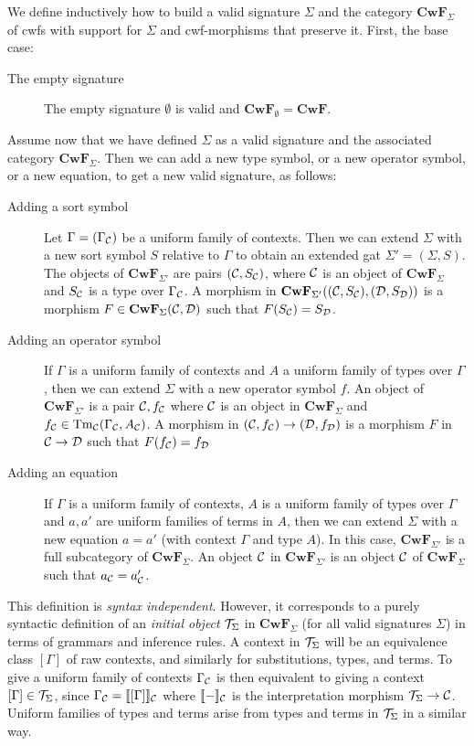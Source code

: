 \documentclass{lmcs}
\def\D{\mathcal{D}}
\def\Cwf{\mathbf{CwF}}
\begin{document}
\begin{definition}
We define inductively how to build a valid signature $\Sigma$ and the category $\Cwf_\Sigma$ of cwfs with support for $\Sigma$ and cwf-morphisms that preserve it. First, the base case:
\begin{description}
\item[The empty signature] The empty signature $\emptyset$ is valid and $\Cwf_\emptyset = \Cwf$. 
\end{description}
Assume now that we have defined $\Sigma$ as a valid signature and the associated
category $\Cwf_{\Sigma}$.
Then we can add a new type symbol, or a new operator symbol, or a new equation, to get a new valid signature,
as follows:
\begin{description}
\item[Adding a sort symbol] 
  Let $\Gamma = (\Gamma_{\mathcal C})$ be a uniform family of contexts.
  Then we can extend $\Sigma$ with a new sort symbol $S$ relative to $\Gamma$ to obtain an extended gat
  $\Sigma' = (\Sigma,S)$.
  The objects of $\Cwf_{\Sigma'}$ are pairs $({\mathcal C},S_{{\mathcal C}})$, where ${\mathcal C}$ is an object of $\Cwf_{\Sigma}$
  and $S_{{\mathcal C}}$ is a type over $\Gamma_{{\mathcal C}}$.
  A morphism in $\Cwf_{\Sigma'}((\C,S_{\C}), (\D,S_{\D}))$
  is a morphism $F \in \Cwf_{\Sigma}(\C,\D)$ such that $F(S_\C) = S_\D$.
\item[Adding an operator symbol] 
  If $\Gamma$ is a uniform family of contexts and $A$ a uniform family of types over $\Gamma$,
  then we can extend $\Sigma$ with a new operator symbol $f$. An object of $\Cwf_{\Sigma'}$
  is a pair ${\mathcal C},f_{{\mathcal C}}$ where ${\mathcal C}$ is an object in $\Cwf_{\Sigma}$ and $f_{{\mathcal C}} \in \mathrm{Tm}_{\mathcal C}(\Gamma_{\mathcal C},A_{\mathcal C})$.
  A morphism in $(\C,f_{\C}) \to (\D,f_{\D})$ is a morphism $F$ in $\C\to \D$ such that $F(f_{\C}) = f_{\D}$
\item[Adding an equation] 
  If $\Gamma$ is a uniform family of contexts, $A$ is a uniform family of types over $\Gamma$
  and $a,a'$ are uniform families of terms in $A$, then we can extend $\Sigma$ with a new equation
  $a = a'$ (with context $\Gamma$ and type $A$). In this case,
  $\Cwf_{\Sigma'}$ is a full subcategory of $\Cwf_{\Sigma}$. An object ${\mathcal C}$ in $\Cwf_{\Sigma'}$ is an object
  ${\mathcal C}$ of $\Cwf_\Sigma$ such that $a_{{\mathcal C}} = a'_{{\mathcal C}}$.
\end{description}

\end{definition}

This definition is {\em syntax independent}. However, it corresponds
to a purely syntactic definition of an {\em initial object} ${\mathcal T}_{\Sigma}$ in $\Cwf_{\Sigma}$ (for all valid signatures $\Sigma$) in terms of grammars and inference rules. A context in ${\mathcal T}_{\Sigma}$ will be an equivalence class $[ \Gamma ]$ of raw contexts, and similarly for substitutions, types, and terms. To give a uniform
  family of contexts $\Gamma_{\mathcal C}$ is then equivalent to giving a context $[ \Gamma ] \in {\mathcal T}_{\Sigma}$, since $\Gamma_{\mathcal C} = \llbracket  [ \Gamma ]  \rrbracket_{\mathcal C}$ where $\llbracket - \rrbracket_{\mathcal C}$ is the interpretation morphism ${\mathcal T}_\Sigma \to {\mathcal C}$.
Uniform families of types and terms arise from types and terms in ${\mathcal T}_\Sigma$ in a similar way.
\end{document}
